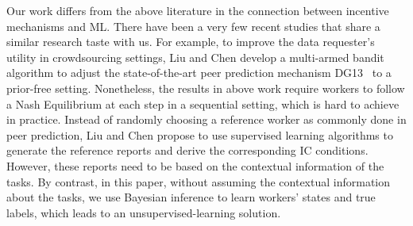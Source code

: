 \documentclass{article}
\begin{document}
Our work differs from the above literature in the connection between incentive mechanisms and ML. There have been a very few recent studies that share a similar research taste with us.
For example, to improve the data requester's utility in crowdsourcing settings, Liu and Chen \cite{liu2017sequential} develop a multi-armed bandit algorithm to adjust the state-of-the-art peer prediction mechanism DG13~\cite{dasgupta2013crowdsourced} to a prior-free setting. Nonetheless, the results in above work require workers to follow a Nash Equilibrium at each step in a sequential setting, which is hard to achieve in practice. Instead of randomly choosing a reference worker as commonly done in peer prediction, Liu and Chen \cite{liu2017machine} propose to use supervised learning algorithms to generate the reference reports and derive the corresponding IC conditions. However, these reports need to be based on the contextual information of the tasks.
By contrast, in this paper, without assuming the contextual information about the tasks, we use Bayesian inference to learn workers' states and true labels, which leads to an unsupervised-learning solution.

\end{document}
